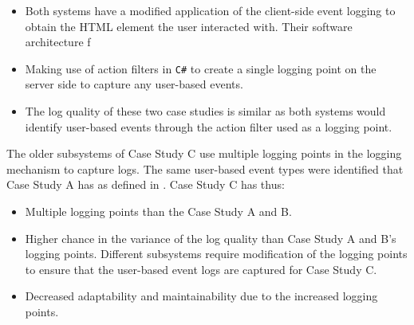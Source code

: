 \begin{itemize}
	\item Both systems have a modified application of the  client-side event logging to obtain the HTML element the user interacted with. Their software architecture f
	\item Making use of action filters in \texttt{C\#} to create a single logging point on the server side to capture any user-based events. 
	\item The log quality of these two case studies is similar as both systems would identify user-based events through the action filter used as a logging point.
\end{itemize}

The older subsystems of Case Study C use multiple logging points in the logging mechanism to capture logs. The same user-based event types were identified that Case Study A has as defined in . Case Study C has thus:

\begin{itemize}
	\item Multiple logging points than the Case Study A and B. 
	\item Higher chance in the variance of the log quality than Case Study A and B's logging points. Different subsystems require modification of the logging points to ensure that the user-based event logs are captured for Case Study C.
	\item Decreased adaptability and maintainability due to the increased logging points.
\end{itemize}

